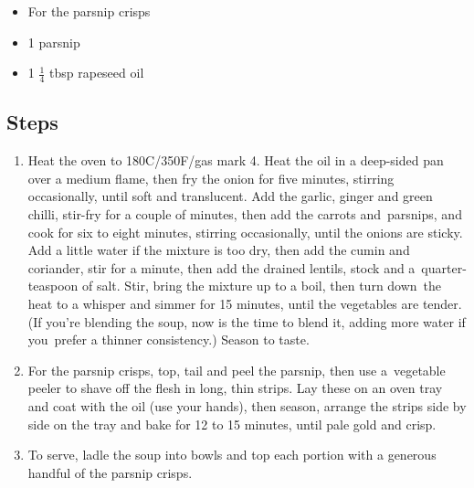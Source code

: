 \documentclass{book}
\begin{document}
\begin{itemize}
\item For the parsnip crisps
\item 1 parsnip
\item 1 $\frac{1}{4}$ tbsp rapeseed oil
\end{itemize}

\subsection*{Steps}
\begin{enumerate}
\item Heat the oven to 180C/350F/gas mark 4. Heat the oil in a deep-sided pan over a medium flame, then fry the onion for five minutes, stirring occasionally, until soft and translucent. Add the garlic, ginger and green chilli, stir-fry for a couple of minutes, then add the carrots and parsnips, and cook for six to eight minutes, stirring occasionally, until the onions are sticky. Add a little water if the mixture is too dry, then add the cumin and coriander, stir for a minute, then add the drained lentils, stock and a quarter-teaspoon of salt. Stir, bring the mixture up to a boil, then turn down the heat to a whisper and simmer for 15 minutes, until the vegetables are tender. (If you’re blending the soup, now is the time to blend it, adding more water if you prefer a thinner consistency.) Season to taste.
\item For the parsnip crisps, top, tail and peel the parsnip, then use a vegetable peeler to shave off the flesh in long, thin strips. Lay these on an oven tray and coat with the oil (use your hands), then season, arrange the strips side by side on the tray and bake for 12 to 15 minutes, until pale gold and crisp.
\item To serve, ladle the soup into bowls and top each portion with a generous handful of the parsnip crisps.
\end{enumerate}
\newpage
\end{document}
